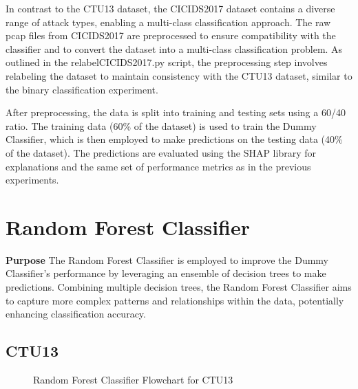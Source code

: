 In contrast to the CTU13 dataset, the CICIDS2017 dataset contains a diverse range of attack types, enabling a multi-class classification approach. The raw pcap files from CICIDS2017 are preprocessed to ensure compatibility with the classifier and to convert the dataset into a multi-class classification problem. As outlined in the relabelCICIDS2017.py script, the preprocessing step involves relabeling the dataset to maintain consistency with the CTU13 dataset, similar to the binary classification experiment.

After preprocessing, the data is split into training and testing sets using a 60/40 ratio. The training data (60\% of the dataset) is used to train the Dummy Classifier, which is then employed to make predictions on the testing data (40\% of the dataset). The predictions are evaluated using the SHAP library for explanations and the same set of performance metrics as in the previous experiments.

\section{Random Forest Classifier}\label{sec:RandomForestClassifier}
\textbf{Purpose} The Random Forest Classifier is employed to improve the Dummy Classifier's performance by leveraging an ensemble of decision trees to make predictions. Combining multiple decision trees, the Random Forest Classifier aims to capture more complex patterns and relationships within the data, potentially enhancing classification accuracy.

\subsection{CTU13}
\begin{figure}[H]
\centering
{}
\caption{Random Forest Classifier Flowchart for CTU13}\label{fig:RandomForestFlowCTU13}
\end{figure}

